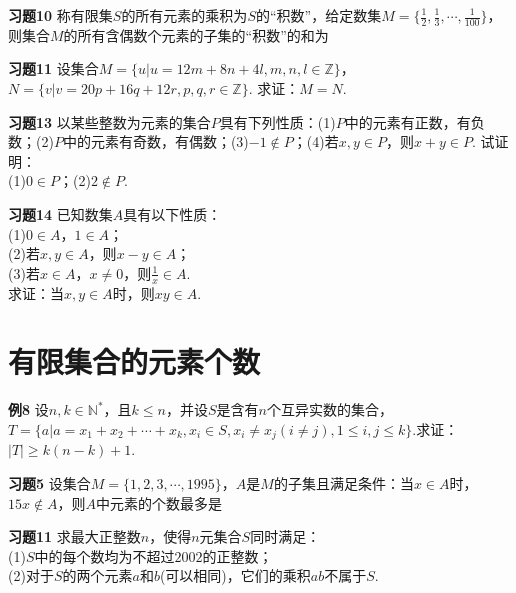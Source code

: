 \documentclass[lang=cn, zihao=4.5]{elegantbook}
\begin{document}
\vspace{30em}
\noindent %
	\textbf{习题10} \quad 称有限集$S$的所有元素的乘积为$S$的“积数”，给定数集$M=\{\frac12,\frac13, \cdots ,\frac{1}{100}\}$，则集合$M$的所有含偶数个元素的子集的“积数”的和为
    
\newpage
\noindent %
	\textbf{习题11} \quad 设集合$M=\{u|u=12m+8n+4l,m,n,l \in \mathbb{Z}\}$，$N=\{v|v=20p+16q+12r,p,q,r \in \mathbb{Z}\}$. 求证：$M=N$.
	
\vspace{30em}
\noindent %
	\textbf{习题13} \quad 以某些整数为元素的集合$P$具有下列性质：(1)$P$中的元素有正数，有负数；(2)$P$中的元素有奇数，有偶数；(3)$-1 \notin P$；(4)若$x,y \in P$，则$x+y \in P$. 试证明：\\
    (1)$0 \in P$；(2)$2 \notin P$.
    
\newpage
\noindent %
    \textbf{习题14} \quad 已知数集$A$具有以下性质：\\
    (1)$0 \in A$，$1 \in A$；\\
    (2)若$x,y \in A$，则$x-y \in A$；\\
    (3)若$x \in A$，$x \neq 0$，则$\frac{1}{x} \in A$. \\
    求证：当$x,y \in A$时，则$xy \in A$.
    
    
    


\newpage
\section{有限集合的元素个数}

\newpage
\noindent %
    \textbf{例8} \quad 设$n,k \in \mathbb{N}^*$，且$k \leq n$，并设$S$是含有$n$个互异实数的集合，$T=\{a|a=x_1+x_2+ \cdots +x_k,x_i \in S,x_i \neq x_j(i \neq j),1 \leq i,j \leq k\}$.求证：$|T| \geq k(n-k)+1$.
    
\vspace{30em}
\noindent %
	\textbf{习题5} \quad 设集合$M=\{1,2,3,\cdots,1995\}$，$A$是$M$的子集且满足条件：当$x \in A$时，$15x \notin A$，则$A$中元素的个数最多是

\newpage
\noindent %
	\textbf{习题11} \quad 求最大正整数$n$，使得$n$元集合$S$同时满足：\\
    (1)$S$中的每个数均为不超过$2002$的正整数；\\
    (2)对于$S$的两个元素$a$和$b$(可以相同)，它们的乘积$ab$不属于$S$.
\end{document}
